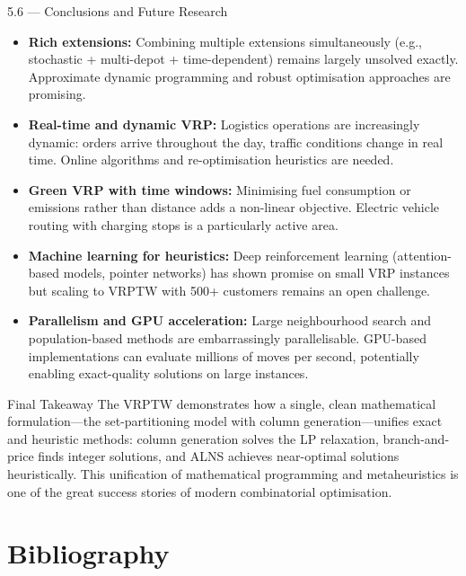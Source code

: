 \documentclass[aspectratio=169,10pt]{beamer}
\begin{document}
\begin{frame}[allowframebreaks]{5.6 --- Conclusions and Future Research}
\begin{itemize}
  \item \textbf{Rich extensions:}  Combining multiple extensions simultaneously
    (e.g., stochastic + multi-depot + time-dependent) remains largely unsolved
    exactly.  Approximate dynamic programming and robust optimisation approaches
    are promising.

  \item \textbf{Real-time and dynamic VRP:}  Logistics operations are increasingly
    dynamic: orders arrive throughout the day, traffic conditions change in real
    time.  Online algorithms and re-optimisation heuristics are needed.

  \item \textbf{Green VRP with time windows:}  Minimising fuel consumption or
    emissions rather than distance adds a non-linear objective.  Electric vehicle
    routing with charging stops is a particularly active area.

  \item \textbf{Machine learning for heuristics:}  Deep reinforcement learning
    (attention-based models, pointer networks) has shown promise on small VRP
    instances but scaling to VRPTW with 500+ customers remains an open challenge.

  \item \textbf{Parallelism and GPU acceleration:}  Large neighbourhood search
    and population-based methods are embarrassingly parallelisable.  GPU-based
    implementations can evaluate millions of moves per second, potentially enabling
    exact-quality solutions on large instances.
\end{itemize}

\begin{alertblock}{Final Takeaway}
The VRPTW demonstrates how a single, clean mathematical formulation---the
set-partitioning model with column generation---unifies exact and heuristic
methods: column generation solves the LP relaxation, branch-and-price finds integer
solutions, and ALNS achieves near-optimal solutions heuristically.  This
unification of mathematical programming and metaheuristics is one of the great
success stories of modern combinatorial optimisation.
\end{alertblock}

\end{frame}

\section{Bibliography}
\end{document}
